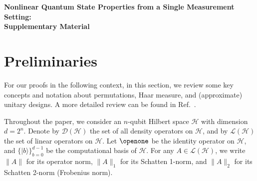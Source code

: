 \documentclass[aps,prl,twocolumn,nofootinbib,superscriptaddress,10pt]{revtex4-2}
\def\>{\rangle}
\newcommand{\bbz}{\mathbb{Z}}
\theoremstyle{plain}
\theoremstyle{definition}
\renewcommand{\thetable}{\Alph{section}\arabic{table}}
\def\eqref#1{\textup{(\ref{#1})}}
\begin{document}
\let\addcontentsline\oldaddcontentsline

\newpage
\onecolumngrid
\newpage
\vspace{3em}
\begin{center}
\textbf{\large Nonlinear Quantum State Properties from a Single Measurement Setting: \\ \smallskip Supplementary Material}
\end{center}

\setcounter{page}{1}


\setcounter{secnumdepth}{3}

\renewcommand{\figurename}{Fig.}
\renewcommand{\theequation}{S\arabic{equation}}
\renewcommand{\thetable}{S\arabic{table}}
\renewcommand{\thetheorem}{S\arabic{theorem}}
\renewcommand{\thelemma}{S\arabic{lemma}} 
\renewcommand{\theprop}{S\arabic{prop}} 
\renewcommand{\thealgorithm}{S\arabic{algorithm}}
\renewcommand{\thefigure}{S\arabic{figure}}

\renewcommand{\thesection}{S\arabic{section}}
\renewcommand{\thesubsection}{\Alph{subsection}}
\renewcommand{\thesubsubsection}{\alph{subsubsection}}

\setcounter{section}{0}
\setcounter{equation}{0}
\setcounter{figure}{0}
\setcounter{lemma}{0}
\setcounter{theorem}{0}
\setcounter{prop}{0}	
\setcounter{algorithm}{0}

\def\eqref#1{\textup{(\ref{#1})}} 




\date{\today}


\tableofcontents

\section{Preliminaries}\label{sec:Prelimi}
For our proofs in the following context, in this section, we review some key concepts and notation about permutations, Haar measure, and (approximate) unitary designs. 
A more detailed review can be found in Ref.~\cite{Mele23}. 

Throughout the paper, we consider an \( n \)-qubit Hilbert space \( \mathcal{H} \) with dimension \( d = 2^n \). Denote by \( \mathcal{D}(\mathcal{H}) \) the set of all density operators on \( \mathcal{H} \), and by \( \mathcal{L}(\mathcal{H}) \) the set of linear operators on \( \mathcal{H} \). Let \( \openone \) be the identity operator on \( \mathcal{H} \), and $\{|b\>\}_{b=0}^{d-1}$ be the computational basis of \( \mathcal{H} \).  %
For any \( A \in \mathcal{L}(\mathcal{H}) \), we write \( \|A\| \) for its operator norm, \( \|A\|_1\) for its Schatten 1-norm, and \( \|A\|_2 \) for its Schatten 2-norm (Frobenius norm).
\end{document}
